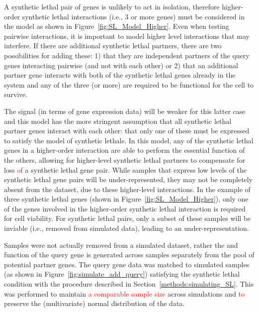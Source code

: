 A \gls{synthetic lethal} pair of genes is unlikely to act in isolation, therefore higher-order \gls{synthetic lethal} interactions (i.e., 3 or more genes) must be considered in the model as shown in Figure~\ref{fig:SL_Model_Higher}. Even when testing pairwise interactions, it is important to model higher level interactions that may interfere. If there are additional \gls{synthetic lethal} partners, there are two possibilities for adding these: 1) that they are independent partners of the query genes interacting pairwise (and not with each other) or 2) that an additional partner gene interacts with both of the \gls{synthetic lethal} genes already in the system and any of the three (or more) are required to be functional for the cell to survive.

The signal (in terms of \gls{gene expression} data) will be weaker for this latter case and this model has the more stringent assumption that all \gls{synthetic lethal} partner genes interact with each other: that only one of these must be expressed to satisfy the model of \glspl{synthetic lethal}. In this model, any of the \gls{synthetic lethal} genes in a higher-order interaction are able to perform the essential function of the others, allowing for higher-level \gls{synthetic lethal} partners to compensate for loss \textcolor{red}{of} a \gls{synthetic lethal} gene pair. While samples that express low levels of the \gls{synthetic lethal} gene pairs will be under-represented, they may not be completely absent from the dataset, due to these higher-level interactions. In the example of three \gls{synthetic lethal} genes (shown in Figure~\ref{fig:SL_Model_Higher}), only one of the genes involved in the higher-order \gls{synthetic lethal} interaction is required for cell viability. For \gls{synthetic lethal} pairs, only a subset of these samples will be inviable (i.e., removed from simulated data), leading to an under-representation.

Samples were not actually removed from a simulated dataset, rather the  and function of the query gene is generated across samples separately from the pool of potential partner genes. The query gene data was matched to simulated samples (as shown in Figure~\ref{fig:simulate_add_query}) satisfying the \gls{synthetic lethal} condition with the procedure described in Section~\ref{methods:simulating_SL}. This was performed to maintain \textcolor{red}{a comparable sample size} across simulations and \textcolor{red}{to} preserve the (multivariate) normal distribution of the data. 

